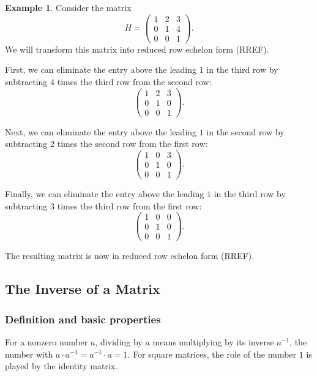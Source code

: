 \documentclass[11pt]{article}
\theoremstyle{definition}
\newtheorem{example}[definition]{Example}
\theoremstyle{plain}
\theoremstyle{remark}
\begin{document}
\begin{example}\label{ex:H}
    Consider the matrix
    \[H = \begin{pmatrix}
        1 & 2 & 3 \\
        0 & 1 & 4 \\
        0 & 0 & 1
    \end{pmatrix}.\]
    We will transform this matrix into reduced row echelon form (RREF).

    First, we can eliminate the entry above the leading $1$ in the third row by subtracting $4$ times the third row from the second row:
    \[\begin{pmatrix}
        1 & 2 & 3 \\
        0 & 1 & 0 \\
        0 & 0 & 1
    \end{pmatrix}.\]

    Next, we can eliminate the entry above the leading $1$ in the second row by subtracting $2$ times the second row from the first row:
    \[\begin{pmatrix}
        1 & 0 & 3 \\
        0 & 1 & 0 \\
        0 & 0 & 1
    \end{pmatrix}.\]

    Finally, we can eliminate the entry above the leading $1$ in the third row by subtracting $3$ times the third row from the first row:
    \[\begin{pmatrix}
        1 & 0 & 0 \\
        0 & 1 & 0 \\
        0 & 0 & 1
    \end{pmatrix}.\]

    The resulting matrix is now in reduced row echelon form (RREF).
\end{example}

\subsection{The Inverse of a Matrix}\label{subsec:inverse}

\subsubsection{Definition and basic properties}

For a nonzero number $a$, dividing by $a$ means multiplying by its inverse $a^{-1}$, the number with $a \cdot a^{-1} = a^{-1} \cdot a = 1$. For square matrices, the role of the number $1$ is played by the identity matrix.
\end{document}
